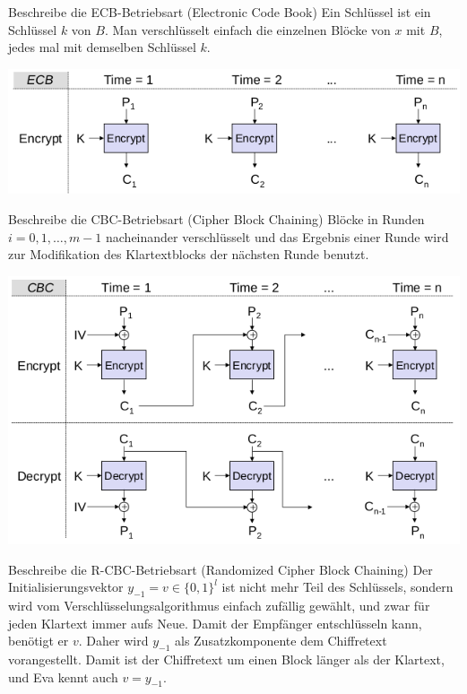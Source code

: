 \documentclass[avery5371, frame]{flashcards}
\begin{document}
\begin{flashcard}[Betriebsarten]{Beschreibe die ECB-Betriebsart (Electronic Code Book)}
    Ein Schlüssel ist ein Schlüssel $k$ von $B$. Man verschlüsselt einfach die einzelnen Blöcke von $x$ mit $B$, jedes mal mit demselben Schlüssel $k$.

    \includegraphics[width=.9\linewidth]{Assets/NetworkSecurity-electronic-code-book-mode.png}
\end{flashcard}

\begin{flashcard}[Betriebsarten]{Beschreibe die CBC-Betriebsart (Cipher Block Chaining)}
    Blöcke in Runden $i=0, 1 ,\dots,m-1$ nacheinander verschlüsselt und das Ergebnis einer Runde wird zur Modifikation des Klartextblocks der nächsten Runde benutzt.

    \includegraphics[width=.6\linewidth]{Assets/NetworkSecurity-cipher-block-chaining-mode.png}
\end{flashcard}

\begin{flashcard}[Betriebsarten]{Beschreibe die R-CBC-Betriebsart (Randomized Cipher Block Chaining)}
    Der Initialisierungsvektor $y_{-1}=v\in\{0,1\}^l$ ist nicht mehr Teil des Schlüssels, sondern wird vom Verschlüsselungsalgorithmus einfach zufällig gewählt, und zwar für jeden Klartext immer aufs Neue. Damit der Empfänger entschlüsseln kann, benötigt er $v$. Daher wird $y_{-1}$ als Zusatzkomponente dem Chiffretext vorangestellt. Damit ist der Chiffretext um einen Block länger als der Klartext, und Eva kennt auch $v=y_{-1}$.
\end{flashcard}
\end{document}
